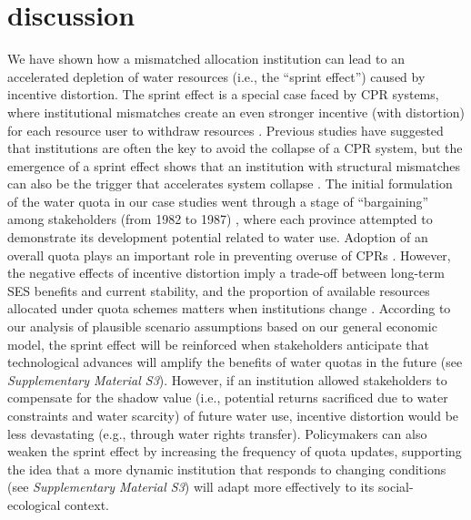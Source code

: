\section{discussion}
We have shown how a mismatched allocation institution can lead to an accelerated depletion of water resources (i.e., the “sprint effect”) caused by incentive distortion. The sprint effect is a special case faced by CPR systems, where institutional mismatches create an even stronger incentive (with distortion) for each resource user to withdraw resources
\cite{ostromRevisitingCommonsLocal1999,ostromGeneralFrameworkAnalyzing2009,castilla-rhoSocialtippingpoints2017}.
Previous studies have suggested that institutions are often the key to avoid the collapse of a CPR system, but the emergence of a sprint effect shows that an institution with structural mismatches can also be the trigger that accelerates system collapse \cite{bodinConservationSuccessFunction2014,bodinCollaborativeenvironmentalgovernance2017,wangAlignmentsocialecological2019}.
The initial formulation of the water quota in our case studies went through a stage of “bargaining” among stakeholders (from 1982 to 1987) \cite{wangReviewImplementationYellow2019, wangThingsCurrentSignificance2019}, where each province attempted to demonstrate its development potential related to water use.
Adoption of an overall quota plays an important role in preventing overuse of CPRs \cite{tilmanLocalizedprosocialpreferences2019}.
However, the negative effects of incentive distortion imply a trade-off between long-term SES benefits and current stability, and the proportion of available resources allocated under quota schemes matters when institutions change \cite{ladeRegimeshiftssocialecological2013}.
According to our analysis of plausible scenario assumptions based on our general economic model, the sprint effect will be reinforced when stakeholders anticipate that technological advances will amplify the benefits of water quotas in the future (see \textit{Supplementary Material S3}).
However, if an institution allowed stakeholders to compensate for the shadow value (i.e., potential returns sacrificed due to water constraints and water scarcity) \cite{howarthAccountingvalueecosystem2002} of future water use, incentive distortion would be less devastating (e.g., through water rights transfer).
Policymakers can also weaken the sprint effect by increasing the frequency of quota updates, supporting the idea that a more dynamic institution that responds to changing conditions (see \textit{Supplementary Material S3}) will adapt more effectively to its social-ecological context.

